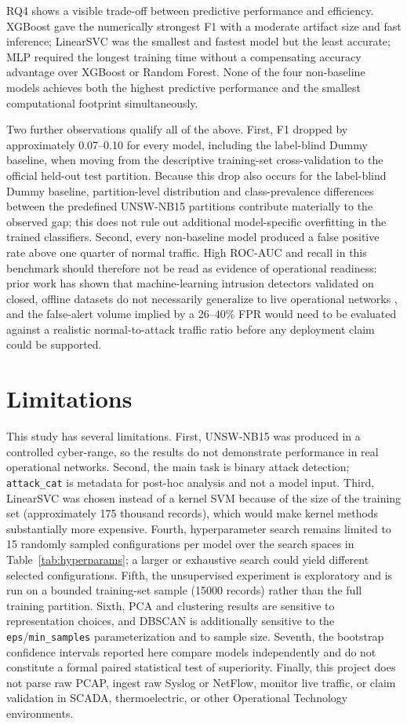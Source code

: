 \documentclass[conference]{IEEEtran}
\begin{document}
RQ4 shows a visible trade-off between predictive performance and efficiency. XGBoost gave the numerically strongest F1 with a moderate artifact size and fast inference; LinearSVC was the smallest and fastest model but the least accurate; MLP required the longest training time without a compensating accuracy advantage over XGBoost or Random Forest. None of the four non-baseline models achieves both the highest predictive performance and the smallest computational footprint simultaneously.

Two further observations qualify all of the above. First, F1 dropped by approximately 0.07--0.10 for every model, including the label-blind Dummy baseline, when moving from the descriptive training-set cross-validation to the official held-out test partition. Because this drop also occurs for the label-blind Dummy baseline, partition-level distribution and class-prevalence differences between the predefined UNSW-NB15 partitions contribute materially to the observed gap; this does not rule out additional model-specific overfitting in the trained classifiers. Second, every non-baseline model produced a false positive rate above one quarter of normal traffic. High ROC-AUC and recall in this benchmark should therefore not be read as evidence of operational readiness: prior work has shown that machine-learning intrusion detectors validated on closed, offline datasets do not necessarily generalize to live operational networks \cite{sommerpaxson2010closed}, and the false-alert volume implied by a 26--40\% FPR would need to be evaluated against a realistic normal-to-attack traffic ratio before any deployment claim could be supported.

\section{Limitations}
This study has several limitations. First, UNSW-NB15 was produced in a controlled cyber-range, so the results do not demonstrate performance in real operational networks. Second, the main task is binary attack detection; \texttt{attack\_cat} is metadata for post-hoc analysis and not a model input. Third, LinearSVC was chosen instead of a kernel SVM because of the size of the training set (approximately 175 thousand records), which would make kernel methods substantially more expensive. Fourth, hyperparameter search remains limited to 15 randomly sampled configurations per model over the search spaces in Table~\ref{tab:hyperparams}; a larger or exhaustive search could yield different selected configurations. Fifth, the unsupervised experiment is exploratory and is run on a bounded training-set sample (15000 records) rather than the full training partition. Sixth, PCA and clustering results are sensitive to representation choices, and DBSCAN is additionally sensitive to the \texttt{eps}/\texttt{min\_samples} parameterization and to sample size. Seventh, the bootstrap confidence intervals reported here compare models independently and do not constitute a formal paired statistical test of superiority. Finally, this project does not parse raw PCAP, ingest raw Syslog or NetFlow, monitor live traffic, or claim validation in SCADA, thermoelectric, or other Operational Technology environments.
\end{document}
